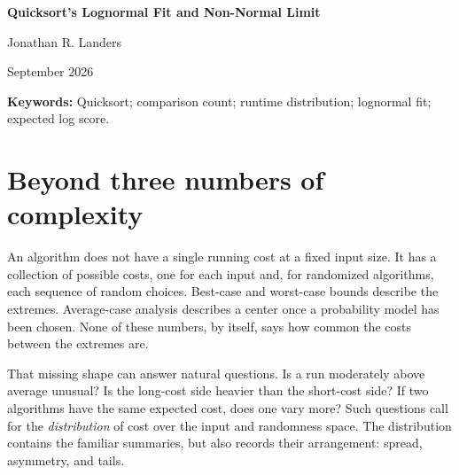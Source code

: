 \documentclass[10pt,letterpaper]{article}
\begin{document}
\thispagestyle{empty}
\begin{center}
{\LARGE\bfseries Quicksort's Lognormal Fit and Non-Normal Limit}\par
\vspace{10pt}
{\normalsize Jonathan R. Landers}\par
\vspace{3pt}
{\small September 2026}
\end{center}
\vspace{4pt}
\begin{abstract}
\noindent Best-case, worst-case, and average-case analyses compress an algorithm's behavior to a few numbers. Yet different inputs produce a distribution of costs, and that distribution has a shape even when its mean is known. We examine the number of comparisons made by classical randomized-pivot Quicksort. Two seemingly conflicting facts hold. For every $n\ge4$, the best ordinary lognormal fit has a strictly higher expected log-density than the best normal fit. Nevertheless, a fitted lognormal does not approach Quicksort's standardized limiting distribution: the latter retains skewness $0.854881\ldots$, while the lognormal becomes asymptotically normal after standardization. We give a moment-based, computer-assisted proof of the finite-size inequality and a short argument for the limiting separation. The main text develops the questions and their interpretation; proofs and exact certificate details follow in the appendix.
\end{abstract}

\textbf{Keywords:} Quicksort; comparison count; runtime distribution; lognormal fit; expected log score.

\section{Beyond three numbers of complexity}
An algorithm does not have a single running cost at a fixed input size. It has a collection of possible costs, one for each input and, for randomized algorithms, each sequence of random choices. Best-case and worst-case bounds describe the extremes. Average-case analysis describes a center once a probability model has been chosen. None of these numbers, by itself, says how common the costs between the extremes are.

That missing shape can answer natural questions. Is a run moderately above average unusual? Is the long-cost side heavier than the short-cost side? If two algorithms have the same expected cost, does one vary more? Such questions call for the \emph{distribution} of cost over the input and randomness space. The distribution contains the familiar summaries, but also records their arrangement: spread, asymmetry, and tails.
\end{document}
